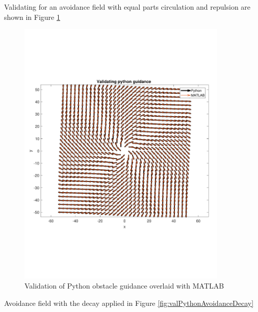 \documentclass[numbered,pdftex]{ohio-etd}
\begin{document}
Validating for an avoidance field with equal parts circulation and repulsion are shown in Figure \ref{fig:valPythonAvoidance}


\begin{figure}
	\centering
	\includegraphics[trim=0 140 0 140,clip,width=10cm]{PaperFigures/Methods/resultsPython/obstacle}
	\caption{Validation of Python obstacle guidance overlaid with MATLAB}
	\label{fig:valPythonAvoidance}
\end{figure}

Avoidance field with the decay applied in Figure \ref{fig:valPythonAvoidanceDecay}
\end{document}
